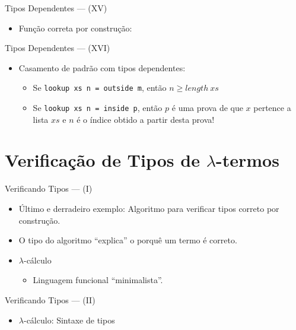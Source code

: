 \documentclass{beamer}
\begin{document}
       \begin{frame}{Tipos Dependentes --- (XV)}
         \begin{itemize}
           \item Fun\c{c}\~ao correta por constru\c{c}\~ao:
         \end{itemize}
       \end{frame}

       \begin{frame}{Tipos Dependentes --- (XVI)}
         \begin{itemize}
           \item Casamento de padr\~ao com tipos dependentes:
           \begin{itemize}
             \item Se \texttt{lookup xs n = outside m}, ent\~ao $n \geq length\: xs$
             \item Se \texttt{lookup xs n = inside p}, ent\~ao $p$ \'e uma prova de que
                   $x$ pertence a lista $xs$ e $n$ \'e o \'indice obtido a partir desta prova!
           \end{itemize}
         \end{itemize}
       \end{frame}

       \section{Verifica\c{c}\~ao de Tipos de $\lambda$-termos}

       \begin{frame}{Verificando Tipos --- (I)}
         \begin{itemize}
           \item \'Ultimo e derradeiro exemplo: Algoritmo para verificar tipos correto por constru\c{c}\~ao.
           \item O tipo do algoritmo ``explica'' o porqu\^e um termo \'e correto.
           \item $\lambda$-c\'alculo
           \begin{itemize}
             \item Linguagem funcional ``minimalista''.
           \end{itemize}
         \end{itemize}
       \end{frame}

       \begin{frame}{Verificando Tipos --- (II)}
         \begin{itemize}
           \item $\lambda$-c\'alculo: Sintaxe de tipos
         \end{itemize}
       \end{frame}
\end{document}
